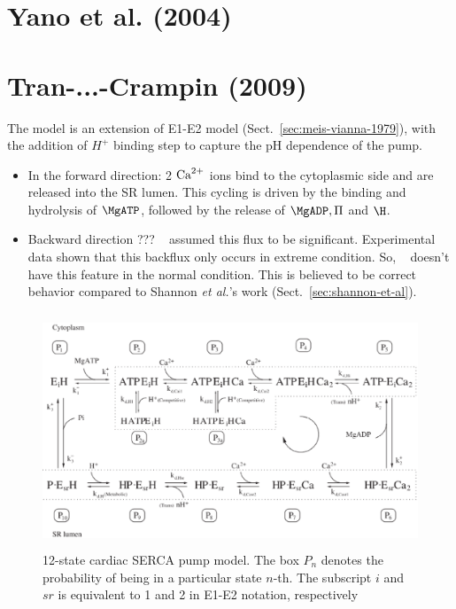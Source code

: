 \section{Yano et al. (2004)}
\label{sec:serca_yano2004}

\citep{yano2004}

\section{Tran-...-Crampin (2009)}
\label{sec:tran-...-crampin}

The model is an extension of E1-E2 model (Sect.~\ref{sec:meis-vianna-1979}),
with the addition of $H^+$ binding step to capture the pH dependence of the pump.
\begin{itemize}
\item In the forward direction: 2 ${\text{Ca}^{2+}}$ ions bind to the cytoplasmic
  side and are released into the SR lumen. This cycling is driven by
  the binding and hydrolysis of $\MgATP$, followed by the release of
  $\MgADP, \Pi$ and $\H$. 

\item Backward direction ??? ~\citep{shannon2000rms} assumed this flux
  to be significant. Experimental data shown that this backflux only
  occurs in extreme condition. So, ~\citep{tran2009} doesn't have this
  feature in the normal condition. This is believed to be correct
  behavior compared to Shannon {\it et al.}'s work
  (Sect.~\ref{sec:shannon-et-al}). 
\end{itemize}


\begin{figure}[hbt]
  \centerline{\includegraphics[height=7cm,
    angle=0]{./images/Tran_SERCA.eps}}
  \caption{12-state cardiac SERCA pump model. The box $P_n$ denotes
    the probability of being in a particular state $n$-th. The
    subscript $i$ and $sr$ is equivalent to 1 and 2 in E1-E2 notation,
    respectively}
  \label{fig:Tran_SERCA}
\end{figure}


